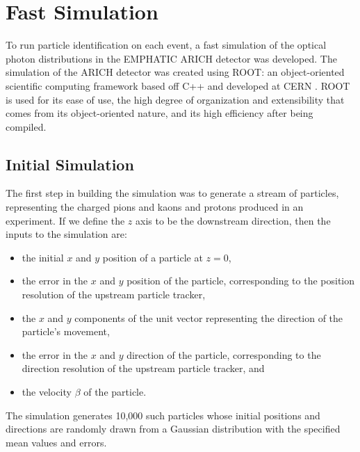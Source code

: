 
\chapter{Fast Simulation}
\label{ch:Methods}
To run particle identification on each event, a fast simulation of the optical photon distributions in the EMPHATIC ARICH detector was developed.
The simulation of the ARICH detector was created using \textsc{ROOT}: an object-oriented scientific computing framework based off C++ and developed at CERN \cite{root}.
\textsc{ROOT} is used for its ease of use, the high degree of organization and extensibility that comes from its object-oriented nature, and its high efficiency after being compiled.

\section{Initial Simulation}
\label{sec:experiment}
The first step in building the simulation was to generate a stream of particles, representing the charged pions and kaons and protons produced in an experiment.
If we define the $z$ axis to be the downstream direction, then the inputs to the simulation are:
\begin{itemize}
\item the initial $x$ and $y$ position of a particle at $z=0$,
\item the error in the $x$ and $y$ position of the particle, corresponding to the position resolution of the upstream particle tracker,
\item the $x$ and $y$ components of the unit vector representing the direction of the particle's movement,
\item the error in the $x$ and $y$ direction of the particle, corresponding to the direction resolution of the upstream particle tracker, and
\item the velocity $\beta$ of the particle.
\end{itemize} 
The simulation generates 10,000 such particles whose initial positions and directions are randomly drawn from a Gaussian distribution with the specified mean values and errors.


